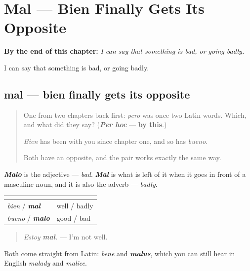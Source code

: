 
\chapter{Mal --- Bien Finally Gets Its Opposite}
\label{ch:mal}

\begin{chapteropening}
\textbf{By the end of this chapter:} \emph{I can say that something is bad, or going badly.}

I can say that something is bad, or going badly.
\end{chapteropening}

\section[mal]{mal — bien finally gets its opposite}

\label{lesson:ES-C60-mal}



\begin{quote}
One from two chapters back first: \emph{pero} was once two Latin words. Which, and what did they say? (\emph{\textbf{Per hoc}} — \textbf{by this}.)

\emph{Bien} has been with you since chapter one, and so has \emph{bueno}.

Both have an opposite, and the pair works exactly the same way.
\end{quote}

\begin{cousinweb}
\emph{\textbf{Malo}} is the adjective — \emph{bad}. \emph{\textbf{Mal}} is what is left of it when it goes in front of a masculine noun, and it is also the adverb — \emph{badly}.

\noindent
\begin{tabularx}{\linewidth}{@{}>{\raggedright\arraybackslash}X>{\raggedright\arraybackslash}X@{}}
\toprule
\textbf{} & \textbf{} \\
\midrule
\emph{bien} / \emph{\textbf{mal}} & well / badly \\
\emph{bueno} / \emph{\textbf{malo}} & good / bad \\
\bottomrule
\end{tabularx}

\begin{quote}
\emph{Estoy} \emph{\textbf{mal}}\emph{.} — I'm not well.
\end{quote}

Both come straight from Latin: \emph{bene} and \emph{\textbf{malus}}, which you can still hear in English \emph{malady} and \emph{malice}.
\end{cousinweb}

